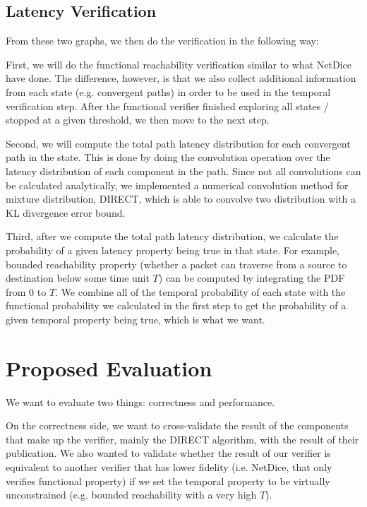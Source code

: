 \documentclass[10pt,sigconf,letterpaper,anonymous,nonacm]{acmart}
\begin{document}
\subsection{Latency Verification}
From these two graphs, we then do the verification in the following way:

First, we will do the functional reachability verification similar to what NetDice have done. 
The difference, however, is that we also collect additional information from each state (e.g. 
convergent paths) in order to be used in the temporal verification step. 
After the functional verifier finished exploring all states / stopped at a given threshold, we 
then move to the next step.

Second, we will compute the total path latency distribution for each convergent path in the state.
This is done by doing the convolution operation over the latency distribution of each component 
in the path. 
Since not all convolutions can be calculated analytically, we implemented a numerical convolution 
method for mixture distribution, DIRECT, which is able to convolve two distribution with a 
KL divergence error bound.

Third, after we compute the total path latency distribution, we calculate the probability of a 
given latency property being true in that state. 
For example, bounded reachability property (whether a packet can traverse from a source to 
destination below some time unit $T$) can be computed by integrating the PDF from $0$ to $T$. 
We combine all of the temporal probability of each state with the functional probability we 
calculated in the first step to get the probability of a given temporal property being true, 
which is what we want.


\section{Proposed Evaluation}
We want to evaluate two things: correctness and performance. 

On the correctness side, we want to cross-validate the result of the components that make up 
the verifier, mainly the DIRECT algorithm, with the result of their publication. 
We also wanted to validate whether the result of our verifier is equivalent to another verifier 
that has lower fidelity (i.e. NetDice, that only verifies functional property) if we set the 
temporal property to be virtually unconstrained (e.g. bounded reachability with a very high 
$T$).
\end{document}
